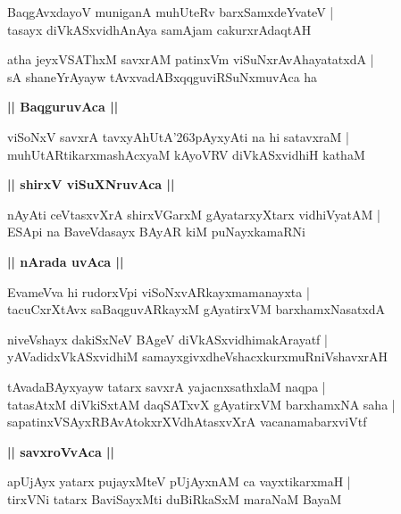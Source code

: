 \documentclass[twoside,12pt,openright]{book}
\def\S{\char'263}
\newcounter{shloka}[chapter]
\def\uvaca#1{\centerline{{\large\textbf{#1}}}}
\begin{document}
\begin{shloka}%
BaqgAvxdayoV muniganA muhUteRv barxSamxdeYvateV |\\
tasayx diVkASxvidhAnAya samAjam cakurxrAdaqtAH 
\end{shloka}

\begin{shloka}%
atha jeyxVSAThxM savxrAM patinxVm viSuNxrAvAhayatatxdA |\\
sA shaneYrAyayw tAvxvadABxqqguviRSuNxmuvAca ha 
\end{shloka}

\uvaca{|| BaqguruvAca ||}

\begin{shloka}%
viSoNxV savxrA tavxyAhUtA\S pAyxyAti na hi satavxraM |\\
muhUtARtikarxmashAcxyaM kAyoVRV diVkASxvidhiH kathaM 
\end{shloka}

\uvaca{|| shirxV viSuXNruvAca ||}

\begin{shloka}%
nAyAti ceVtasxvXrA shirxVGarxM gAyatarxyXtarx vidhiVyatAM |\\
ESApi na BaveVdasayx BAyAR kiM puNayxkamaRNi
\end{shloka}

\uvaca{|| nArada uvAca ||}

\begin{shloka}%
EvameVva hi rudorxVpi viSoNxvARkayxmamanayxta |\\
tacuCxrXtAvx saBaqguvARkayxM gAyatirxVM barxhamxNasatxdA
\end{shloka}

\begin{shloka}%
niveVshayx dakiSxNeV BAgeV diVkASxvidhimakArayatf |\\
yAVadidxVkASxvidhiM samayxgivxdheVshacxkurxmuRniVshavxrAH
\end{shloka}

\begin{shloka}%
tAvadaBAyxyayw tatarx savxrA yajacnxsathxlaM naqpa |\\
tatasAtxM diVkiSxtAM daqSATxvX gAyatirxVM barxhamxNA saha |\\
sapatinxVSAyxRBAvAtokxrXVdhAtasxvXrA vacanamabarxviVtf
\end{shloka}

\uvaca{|| savxroVvAca ||}

\begin{shloka}%
apUjAyx yatarx pujayxMteV pUjAyxnAM ca vayxtikarxmaH |\\
tirxVNi tatarx BaviSayxMti duBiRkaSxM maraNaM BayaM 
\end{shloka}
\end{document}
